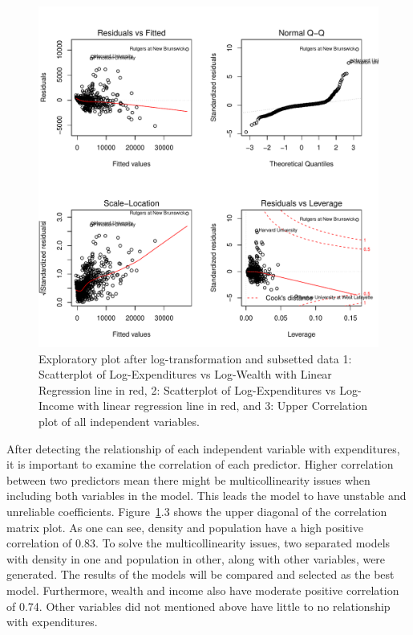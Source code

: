 \documentclass[11pt]{article}\usepackage[]{graphicx}\usepackage[]{color}
\makeatletter
\def\maxwidth{ %
  \ifdim\Gin@nat@width>\linewidth
    \linewidth
  \else
    \Gin@nat@width
  \fi
}
\makeatother
\begin{document}
\begin{figure}[h!] 
\begin{center}

\includegraphics[width=\maxwidth]{figure/unnamed-chunk-3-1} 

\caption{Exploratory plot after log-transformation and subsetted data 1: Scatterplot of Log-Expenditures vs Log-Wealth with Linear Regression line in red, 2: Scatterplot of Log-Expenditures vs Log-Income with linear regression line in red, and 3: Upper Correlation plot of all independent variables.}
\label{sec-explore}
\end{center} 
\end{figure}

\noindent After detecting the relationship of each independent variable with expenditures, it is important to examine the correlation of each predictor. Higher correlation between two predictors mean there might be multicollinearity issues when including both variables in the model. This leads the model to have unstable and unreliable coefficients. Figure~\ref{sec-explore}.3 shows the upper diagonal of the correlation matrix plot. As one can see, density and population have a high positive correlation of 0.83. To solve the multicollinearity issues, two separated models with density in one and population in other, along with other variables, were generated. The results of the models will be compared and selected as the best model. Furthermore, wealth and income also have moderate positive correlation of 0.74. Other variables did not mentioned above have little to no relationship with expenditures.          
\hfill \break
\end{document}
